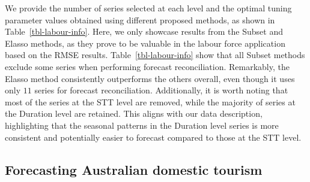 \documentclass[11pt,a4paper,]{article}
\begin{document}
\hypertarget{tbl-labour-info}{}
\begin{table}[!h]
\caption{\label{tbl-labour-info}Number of time series selected using different proposed methods and the
optimal parameter values identified in the labour application. }\tabularnewline

\centering
{}
\end{table}

We provide the number of series selected at each level and the optimal
tuning parameter values obtained using different proposed methods, as
shown in Table~\ref{tbl-labour-info}. Here, we only showcase results
from the Subset and Elasso methods, as they prove to be valuable in the
labour force application based on the RMSE results.
Table~\ref{tbl-labour-info} show that all Subset methods exclude some
series when performing forecast reconciliation. Remarkably, the Elasso
method consistently outperforms the others overall, even though it uses
only \(11\) series for forecast reconciliation. Additionally, it is
worth noting that most of the series at the STT level are removed, while
the majority of series at the Duration level are retained. This aligns
with our data description, highlighting that the seasonal patterns in
the Duration level series is more consistent and potentially easier to
forecast compared to those at the STT level.

\hypertarget{sec-tourism}{%
\subsection{Forecasting Australian domestic tourism}\label{sec-tourism}}
\end{document}

